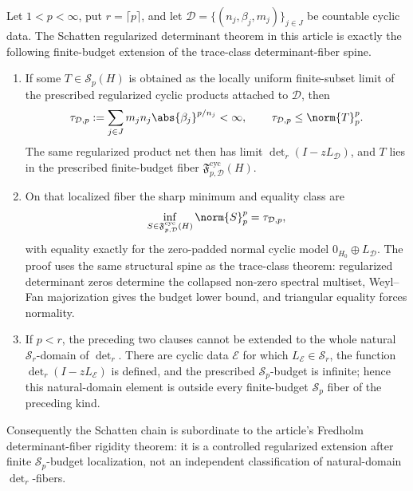 \begin{proposition}
  \label{prop:schatten-extension-dependency-spine}
  Let \(1<p<\infty\), put \(r=\lceil p\rceil\), and let
  \(\mathcal D=\{(n_j,\beta_j,m_j)\}_{j\in J}\) be countable cyclic data.  The
Schatten regularized determinant theorem in this article is exactly the
  following finite-budget extension of the trace-class determinant-fiber spine.
  \begin{enumerate}[label=\textup{(\roman*)},leftmargin=1.7em]
    \item If some \(T\in\mathcal S_p(H)\) is obtained as the locally uniform
    finite-subset limit of the prescribed regularized cyclic products attached
    to \(\mathcal D\), then
    \[
      \tau_{\mathcal D,p}
      :=\sum_{j\in J}m_jn_j\abs{\beta_j}^{p/n_j}<\infty,
      \qquad
      \,\tau_{\mathcal D,p}\le\norm{T}_p^p.
    \]
    The same regularized product net then has limit
    \(\det_r(I-zL_{\mathcal D})\), and
    \(T\) lies in the prescribed finite-budget fiber
    \(\mathfrak F_{p,\mathcal D}^{\mathrm{cyc}}(H)\).
    \item On that localized fiber the sharp minimum and equality class are
    \[
      \inf_{S\in\mathfrak F_{p,\mathcal D}^{\mathrm{cyc}}(H)}
      \norm{S}_p^p
      =\tau_{\mathcal D,p},
    \]
    with equality exactly for the zero-padded normal cyclic model
    \(0_{H_0}\oplus L_{\mathcal D}\).  The proof uses the same structural
    spine as the trace-class theorem: regularized determinant zeros determine
    the collapsed non-zero spectral multiset, Weyl--Fan majorization gives the
    budget lower bound, and triangular equality forces normality.
    \item If \(p<r\), the preceding two clauses cannot be extended to the whole
    natural \(\mathcal S_r\)-domain of \(\det_r\).  There are cyclic data
    \(\mathcal E\) for which \(L_{\mathcal E}\in\mathcal S_r\), the function
    \(\det_r(I-zL_{\mathcal E})\) is defined, and the prescribed
    \(\mathcal S_p\)-budget is infinite; hence this natural-domain element is
    outside every finite-budget \(\mathcal S_p\) fiber of the preceding kind.
  \end{enumerate}
  Consequently the Schatten chain is subordinate to the article's Fredholm
  determinant-fiber rigidity theorem: it is a controlled regularized extension
  after finite \(\mathcal S_p\)-budget localization, not an independent
  classification of natural-domain \(\det_r\)-fibers.
\end{proposition}

